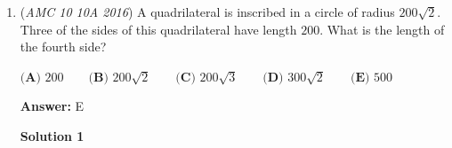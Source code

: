 \begin{enumerate}
\textbf{Solution 6 (Fast)}

First, looking at the conditions, we know that any nonzero real number $a$ satisfies:$a \diamondsuit (a \diamondsuit a) = (a \diamondsuit a) \cdot a$Using the next condition, we get that:$a \diamondsuit 1 = a$

 Notice that $2016 \diamondsuit 1 = 2016 \diamondsuit (6 \diamondsuit 6) = (2016 \diamondsuit 6) \cdot 6 =  2016$. Hence, $2016 \diamondsuit 6 = 336$. Thus, $2016 \diamondsuit (6 \diamondsuit x)=100 \implies (2016 \diamondsuit 6) \cdot x = 100 \implies 336x=100 \implies x=\frac{25}{84}$. Therefore, the answer is $\boxed{\textbf{(A) }109}$




\textbf{Solution 7}

We can rewrite $2016\diamondsuit (6\diamondsuit x)=100$ as $2016\diamondsuit 6=\dfrac{100}x.$ We do a series of algebraic  manipulations: 

 
 \[(2016\diamondsuit 6)\cdot6=\dfrac{600}x\]
 \[2016\diamondsuit (6\diamondsuit 6)=\dfrac{600}x\]
 \[2016\diamondsuit 1=\dfrac{600}x.\]

 Let $a=2016\diamondsuit 1.$

 \[2016a=(2016\diamondsuit 1)\cdot 2016\]
 \[2016a=2016\diamondsuit (1\diamondsuit 2016)\]

 We let $b=1\diamondsuit 2016.$

 \[2016b=(1\diamondsuit 2016)\cdot2016\]
 \[2016b=1\diamondsuit (2016\diamondsuit 2016)\]
 \[2016b=1\diamondsuit 1=1\]
 \[b=\dfrac1{2016}\]

 We notice that $1\diamondsuit 2016=\dfrac1{2016},$ which makes $a\diamondsuit b$ look suspiciously like $\dfrac ab.$ Sure enough, when we try the given condition on $a\diamondsuit b=\dfrac ab,$ we see that it works. We evaluate $2016\diamondsuit (6\diamondsuit x)=100,$ and get $x=\dfrac{25}{84},$ and therefore $p+q=25+84=109.$



	\item (\textit{AMC 10 10A 2016}) A quadrilateral is inscribed in a circle of radius $200\sqrt{2}$. Three of the sides of this quadrilateral have length $200$. What is the length of the fourth side?


 $\textbf{(A) }200\qquad \textbf{(B) }200\sqrt{2}\qquad\textbf{(C) }200\sqrt{3}\qquad\textbf{(D) }300\sqrt{2}\qquad\textbf{(E) } 500$

 \textbf{Answer: }E



\textbf{Solution 1}



\end{enumerate}
